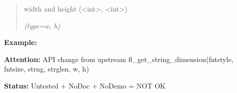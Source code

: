 \begin{boxedminipage}{\funcwidth}
      \begin{quote}
      width and height ({\textless}int{\textgreater}, 
      {\textless}int{\textgreater})

      {\it (type=w, h)}

      \end{quote}

\textbf{Example:} 

\textbf{Attention:} API change from upstream fl\_get\_string\_dimension(fntstyle, fntsize, 
strng, strglen, w, h)



\textbf{Status:} Untested + NoDoc + NoDemo = NOT OK



    \end{boxedminipage}

    \label{xformslib:library:fl_get_align_xy}

    \vspace{0.5ex}

